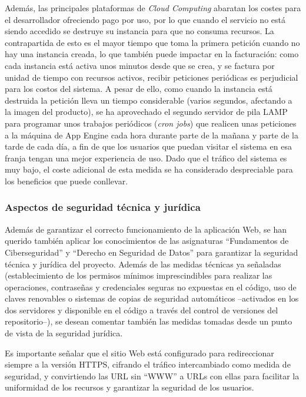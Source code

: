 Además, las principales plataformas de \textit{Cloud Computing} abaratan los costes para el desarrollador ofreciendo pago por uso, por lo que cuando el servicio no está siendo accedido se destruye su instancia para que no consuma recursos. La contrapartida de esto es el mayor tiempo que toma la primera petición cuando no hay una instancia creada, lo que también puede impactar en la facturación: como cada instancia está activa unos minutos desde que se crea, y se factura por unidad de tiempo con recursos activos, recibir peticiones periódicas es perjudicial para los costos del sistema. A pesar de ello, como cuando la instancia está destruida la petición lleva un tiempo considerable (varios segundos, afectando a la imagen del producto), se ha aprovechado el segundo servidor de pila LAMP para programar unos trabajos periódicos (\textit{cron jobs}) que realicen unas peticiones a la máquina de App Engine cada hora durante parte de la mañana y parte de la tarde de cada día, a fin de que los usuarios que puedan visitar el sistema en esa franja tengan una mejor experiencia de uso. Dado que el tráfico del sistema es muy bajo, el coste adicional de esta medida se ha considerado despreciable para los beneficios que puede conllevar.

\subsubsection{Aspectos de seguridad técnica y jurídica}

Además de garantizar el correcto funcionamiento de la aplicación Web, se han querido también aplicar los conocimientos de las asignaturas ``Fundamentos de Ciberseguridad'' y ``Derecho en Seguridad de Datos'' para garantizar la seguridad técnica y jurídica del proyecto. Además de las medidas técnicas ya señaladas (establecimiento de los permisos mínimos imprescindibles para realizar las operaciones, contraseñas y credenciales seguras no expuestas en el código, uso de claves renovables o sistemas de copias de seguridad automáticos –activados en los dos servidores y disponible en el código a través del control de versiones del repositorio–), se desean comentar también las medidas tomadas desde un punto de vista de la seguridad jurídica.

Es importante señalar que el sitio Web está configurado para redireccionar siempre a la versión HTTPS, cifrando el tráfico intercambiado como medida de seguridad, y convirtiendo las URL sin ``WWW'' a URLs con ellas para facilitar la uniformidad de los recursos y garantizar la seguridad de los usuarios.

